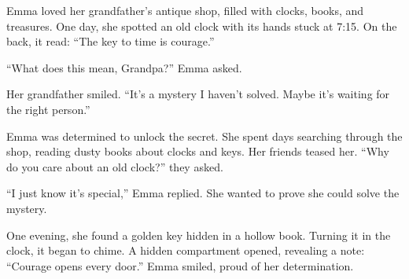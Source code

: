 \documentclass[12pt]{article}
\begin{document}
\begin{tcolorbox}[colframe=black!60, colback=white, 
coltitle=black, colbacktitle=black!15, fonttitle=\bfseries\Large, 
title=Text: Emma and the Mysterious Clock, halign title=center, left=10pt, right=10pt, top=10pt, bottom=15pt]


Emma loved her grandfather’s antique shop, filled with clocks, books, and treasures. One day, she spotted an old clock with its hands stuck at 7:15. On the back, it read: “The key to time is courage.”

“What does this mean, Grandpa?” Emma asked.

Her grandfather smiled. “It’s a mystery I haven’t solved. Maybe it’s waiting for the right person.”

Emma was determined to unlock the secret. She spent days searching through the shop, reading dusty books about clocks and keys. Her friends teased her. “Why do you care about an old clock?” they asked.

“I just know it’s special,” Emma replied. She wanted to prove she could solve the mystery.

One evening, she found a golden key hidden in a hollow book. Turning it in the clock, it began to chime. A hidden compartment opened, revealing a note: “Courage opens every door.” Emma smiled, proud of her determination.


 
\end{tcolorbox}

\vspace{1em}
\end{document}
